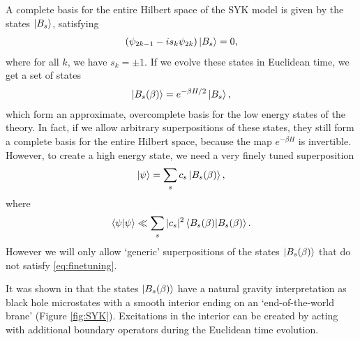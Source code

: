 \documentclass[11pt,a4paper]{article}
\begin{document}
A complete basis for the entire Hilbert space of the SYK model is given by the states $\ket{B_s}$, satisfying
\begin{align}
\left(\psi_{2k-1} - i s_k \psi_{2k} \right) \ket{B_s} = 0,
\end{align}
where for all $k$, we have $s_k = \pm 1$. If we evolve these states in Euclidean time, we get a set of states
\begin{align}
\ket{B_s (\beta)} = e^{-\beta H / 2} \ket{B_s},
\end{align}
which form an approximate, overcomplete basis for the low energy states of the theory. In fact, if we allow arbitrary superpositions of these states, they still form a complete basis for the entire Hilbert space, because the map $e^{-\beta H}$ is invertible. However, to create a high energy state, we need a very finely tuned superposition
\begin{align}
\ket{\psi} = \sum_s c_s \ket{B_s (\beta)},
\end{align}
where
\begin{align} \label{eq:finetuning}
\braket{\psi|\psi} \ll \sum_s |c_s|^2 \braket{B_s (\beta) |B_s (\beta)}.
\end{align}
However we will only allow `generic' superpositions of the states $\ket{B_s (\beta)}$ that do not satisfy \eqref{eq:finetuning}.

It was shown in \cite{kourkoulou2017pure} that the states $\ket{B_s (\beta)}$ have a natural gravity interpretation as black hole microstates with a smooth interior ending on an `end-of-the-world brane' (Figure \ref{fig:SYK}). Excitations in the interior can be created by acting with additional boundary operators during the Euclidean time evolution. 
\end{document}
